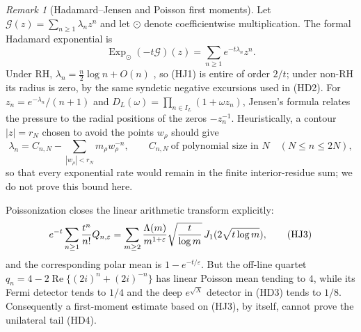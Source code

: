 \documentclass[11pt]{amsart}
\theoremstyle{definition}
\theoremstyle{remark}
\newtheorem{remark}[theorem]{Remark}
\theoremstyle{definition}
\renewcommand{\Re}{\operatorname{Re}}
\begin{document}
\begin{remark}[Hadamard--Jensen and Poisson first moments]
\label{rmk:hadamard-jensen-poisson-gates}
Let $\mathcal G(z)=\sum_{n\ge1}\lambda_nz^n$ and let $\odot$ denote
coefficientwise multiplication.  The formal Hadamard exponential is
\[
 \operatorname {Exp}_{\odot}(-t\mathcal G)(z)
 =\sum_{n\ge1}e^{-t\lambda_n}z^n.                        \tag{HJ1}
\]
Under RH, $\lambda_n=\frac n2\log n+O(n)$ \cite{Lagarias2007}, so (HJ1) is
entire of order $2/t$; under non-RH its radius is zero,
by the same syndetic negative excursions used in (HD2).  For
$z_n=e^{-\lambda_n}/(n+1)$ and
$D_L(\omega)=\prod_{n\in I_L}(1+\omega z_n)$, Jensen's formula relates the
pressure to the radial positions of the zeros $-z_n^{-1}$.  Heuristically, a
contour $|z|=r_N$ chosen to avoid the points $w_\rho$ should give
\[
 \lambda_n=C_{n,N}-\sum_{|w_\rho|<r_N}m_\rho w_\rho^{-n},
 \qquad C_{n,N}\ \text{of polynomial size in }N\quad(N\le n\le2N),  \tag{HJ2}
\]
so that every exponential rate would remain in the finite interior-residue
sum; we do not prove this bound here.

Poissonization closes the linear arithmetic transform explicitly:
\[
 e^{-t}\sum_{n\ge1}{t^n\over n!}Q_{n,\varepsilon}
 =\sum_{m\ge2}{\Lambda(m)\over m^{1+\varepsilon}}
   \sqrt{t\over\log m}\,J_1(2\sqrt{t\log m}),           \tag{HJ3}
\]
and the corresponding polar mean is $1-e^{-t/\varepsilon}$.  But the
off-line quartet $q_n=4-2\Re\{(2i)^n+(2i)^{-n}\}$ has linear Poisson mean
tending to $4$, while its Fermi detector tends to $1/4$ and the deep
$e^{\sqrt X}$ detector in (HD3) tends to $1/8$.  Consequently a first-moment
estimate based on (HJ3), by itself, cannot prove the unilateral tail (HD4).
\end{remark}
\end{document}
